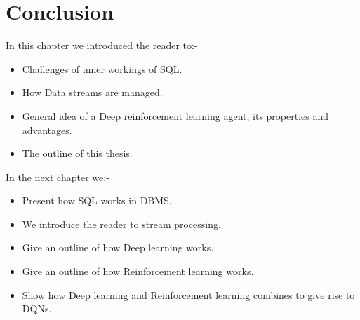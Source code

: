 \section{Conclusion}
\label{sec:Conclusion}
In this chapter we introduced the reader to:-
\begin{itemize}
    \item Challenges of inner workings of SQL. 
    \item How Data streams are managed.
    \item General idea of a Deep reinforcement learning agent, its properties and advantages.
    \item The outline of this thesis.
\end{itemize}
In the next chapter we:-
\begin{itemize}
    \item Present how SQL works in DBMS.
    \item We introduce the reader to stream processing.
    \item Give an outline of how Deep learning works.
    \item Give an outline of how Reinforcement learning works.
    \item Show how Deep learning and Reinforcement learning combines to give rise to DQNs.
\end{itemize}

